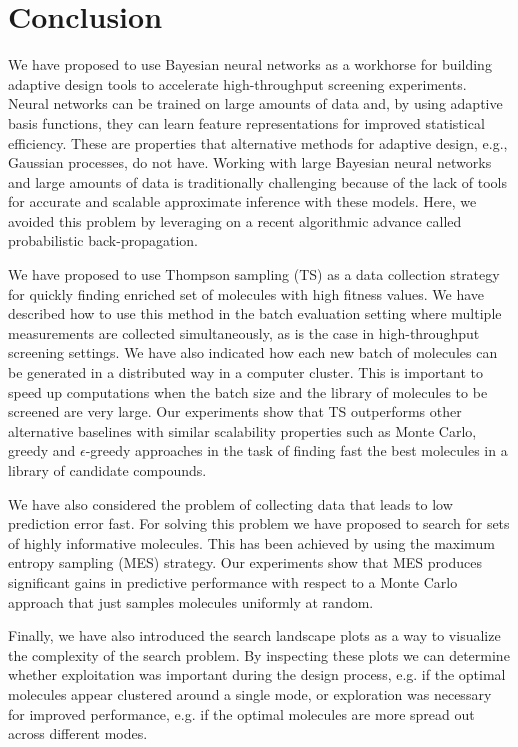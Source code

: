 \section{Conclusion}

We have proposed to use Bayesian neural networks as a workhorse for building adaptive design tools to accelerate high-throughput screening experiments. Neural networks can be trained on large amounts of data and, by using adaptive basis functions, they can learn feature representations for improved statistical efficiency. These are properties that alternative methods for adaptive design, e.g., Gaussian processes, do not have. Working with large Bayesian neural networks and large amounts of data is traditionally challenging because of the lack of tools for accurate and scalable approximate inference with these models. Here, we avoided this problem by leveraging on a recent algorithmic advance called probabilistic back-propagation.

We have proposed to use Thompson sampling (TS) as a data collection strategy for quickly finding enriched set of molecules with high fitness values. We have described how to use this method in the batch evaluation setting where multiple measurements are collected simultaneously, as is the case in high-throughput screening settings. We have also indicated how each new batch of molecules can be generated in a distributed way in a computer cluster. This is important to speed up computations when the batch size and the library of molecules to be screened are very large. Our experiments show that TS outperforms other alternative baselines with similar scalability properties such as Monte Carlo, greedy and $\epsilon$-greedy approaches in the task of finding fast the best molecules in a library of candidate compounds.

We have also considered the problem of collecting data that leads to low prediction error fast. For solving this problem we have proposed to search for sets of highly informative molecules. This has been achieved by using the maximum entropy sampling (MES) strategy. Our experiments show that MES produces significant gains in predictive performance with respect to a Monte Carlo approach that just samples molecules uniformly at random.

Finally, we have also introduced the search landscape plots as a way to visualize the complexity of the search problem. By inspecting these plots we can determine whether exploitation was important during the design process, e.g. if the optimal molecules appear clustered around a single mode, or exploration was necessary for improved performance, e.g. if the optimal molecules are more spread out across different modes.